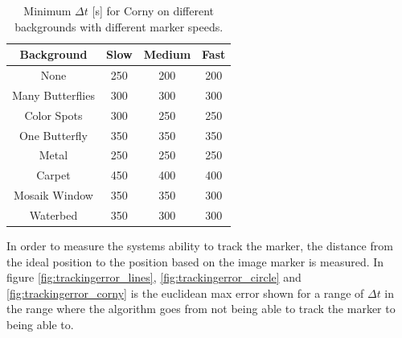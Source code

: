 
\begin{table}[H]
\center
\begin{tabular}{|c|c|c|c|}
\hline
Background       & Slow & Medium & Fast \\ \hline
None             & 250  & 200    & 200\\ \hline 
Many Butterflies & 300  & 300    & 300\\ \hline 
Color Spots      & 300  & 250    & 250\\ \hline 
One Butterfly    & 350  & 350    & 350\\ \hline 
Metal            & 250  & 250    & 250\\ \hline 
Carpet           & 450  & 400    & 400\\ \hline 
Mosaik Window    & 350  & 350    & 300\\ \hline 
Waterbed         & 350  & 300    & 300\\ \hline 
\end{tabular}
\caption{Minimum $\Delta t$ [s] for Corny on different backgrounds with different marker speeds.}
\label{tb:min_dt_corny}
\end{table}

In order to measure the systems ability to track the marker, the distance from the ideal position to the position based on the image marker is measured.
In figure \ref{fig:trackingerror_lines}, \ref{fig:trackingerror_circle} and \ref{fig:trackingerror_corny} is the euclidean max error shown for a range of $\Delta t$ in the range where the algorithm goes from not being able to track the marker to being able to.

